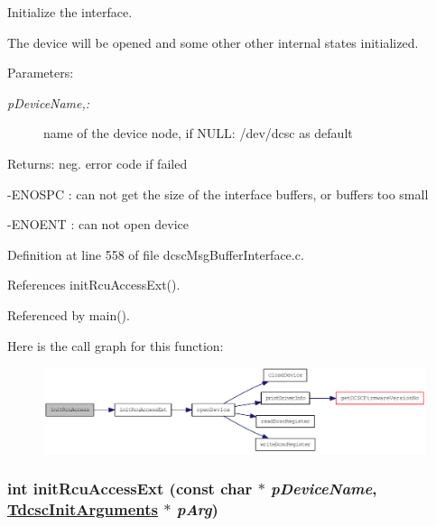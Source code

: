Initialize the interface. 

The device will be opened and some other other internal states initialized. \begin{Desc}
\item[Parameters:]
\begin{description}
\item[{\em p\-Device\-Name,:}]name of the device node, if NULL: /dev/dcsc as default \end{description}
\end{Desc}
\begin{Desc}
\item[Returns:]neg. error code if failed\par
 -ENOSPC : can not get the size of the interface buffers, or buffers too small\par
 -ENOENT : can not open device \end{Desc}


Definition at line 558 of file dcsc\-Msg\-Buffer\-Interface.c.

References init\-Rcu\-Access\-Ext().

Referenced by main().

Here is the call graph for this function:\begin{figure}[H]
\begin{center}
\leavevmode
\includegraphics[width=350pt]{group__dcsc__msg__buffer__access_gfc4448a8f5f9654cf54ad494f1558594_cgraph}
\end{center}
\end{figure}
\hypertarget{group__dcsc__msg__buffer__access_g95f13464dd4da9231a53e7adbb0e7d4e}{
\subsubsection[initRcuAccessExt]{\setlength{\rightskip}{0pt plus 5cm}int init\-Rcu\-Access\-Ext (const char $\ast$ {\em p\-Device\-Name}, \hyperlink{structdcscInitArguments__t}{Tdcsc\-Init\-Arguments} $\ast$ {\em p\-Arg})}}
\label{group__dcsc__msg__buffer__access_g95f13464dd4da9231a53e7adbb0e7d4e}


